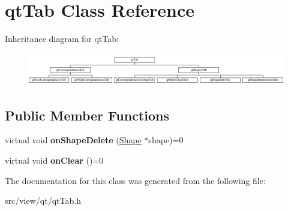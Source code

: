 \hypertarget{classqt_tab}{}\section{qt\+Tab Class Reference}
\label{classqt_tab}
Inheritance diagram for qt\+Tab\+:\begin{figure}[H]
\begin{center}
\leavevmode
\includegraphics[height=1.450777cm]{classqt_tab}
\end{center}
\end{figure}
\subsection*{Public Member Functions}
\begin{DoxyCompactItemize}
\item 
\hypertarget{classqt_tab_a8811879f2aaf15777025427eec7b9fd9}{}virtual void {\bfseries on\+Shape\+Delete} (\hyperlink{class_shape}{Shape} $\ast$shape)=0\label{classqt_tab_a8811879f2aaf15777025427eec7b9fd9}

\item 
\hypertarget{classqt_tab_aeca48d82349df4c61fbfb66c4273c9b6}{}virtual void {\bfseries on\+Clear} ()=0\label{classqt_tab_aeca48d82349df4c61fbfb66c4273c9b6}

\end{DoxyCompactItemize}


The documentation for this class was generated from the following file\+:\begin{DoxyCompactItemize}
\item 
src/view/qt/qt\+Tab.\+h\end{DoxyCompactItemize}
